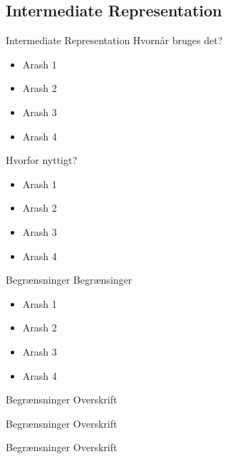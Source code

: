 \subsection{Intermediate Representation}
\begin{frame}{Intermediate Representation}{}
  Hvornår bruges det?
  \begin{itemize}
    \item<1-> Arash 1
    \item<2-> Arash 2
    \item<3-> Arash 3
    \item<4-> Arash 4
  \end{itemize}
  Hvorfor nyttigt?
  \begin{itemize}
    \item<1-> Arash 1
    \item<2-> Arash 2
    \item<3-> Arash 3
    \item<4-> Arash 4
  \end{itemize}
\end{frame}

\begin{frame}{Begrænsninger}{}
  Begrænsinger
  \begin{itemize}
    \item<1-> Arash 1
    \item<2-> Arash 2
    \item<3-> Arash 3
    \item<4-> Arash 4
  \end{itemize}
\end{frame}

\begin{frame}{Begrænsninger}{}
  Overskrift
\end{frame}

\begin{frame}{Begrænsninger}{}
  Overskrift
\end{frame}

\begin{frame}{Begrænsninger}{}
  Overskrift
\end{frame}
